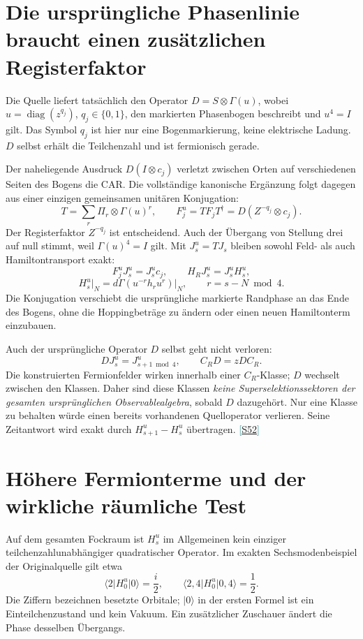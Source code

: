 \documentclass[11pt,a4paper,oneside,parskip=half,headings=normal,numbers=noenddot,bibliography=totoc]{scrreprt}
\newcommand{\ket}[1]{\lvert #1\rangle}
\newcommand{\bra}[1]{\langle #1\rvert}
\newcommand{\src}[1]{\textcolor{teal}{\small[\hyperref[s:#1]{S#1}]}}
\begin{document}
\section{Die ursprüngliche Phasenlinie braucht einen zusätzlichen Registerfaktor}
Die Quelle liefert tatsächlich den Operator $D=S\otimes\Gamma(u)$, wobei $u=\operatorname{diag}(z^{q_j})$, $q_j\in\{0,1\}$, den markierten Phasenbogen beschreibt und $u^4=I$ gilt. Das Symbol $q_j$ ist hier nur eine Bogenmarkierung, keine elektrische Ladung. $D$ selbst erhält die Teilchenzahl und ist fermionisch gerade.

Der naheliegende Ausdruck $D(I\otimes c_j)$ verletzt zwischen Orten auf verschiedenen Seiten des Bogens die CAR. Die vollständige kanonische Ergänzung folgt dagegen aus einer einzigen gemeinsamen unitären Konjugation:
\[
 T=\sum_r\Pi_r\otimes\Gamma(u)^r,
 \qquad
 \boxed{F_j^u=T F_jT^\dagger=D(Z^{-q_j}\otimes c_j).}
\]
Der Registerfaktor $Z^{-q_j}$ ist entscheidend. Auch der Übergang von Stellung drei auf null stimmt, weil $\Gamma(u)^4=I$ gilt. Mit $J_s^u=TJ_s$ bleiben sowohl Feld- als auch Hamiltontransport exakt:
\[
 F_j^uJ_s^u=J_s^u c_j,
 \qquad
 H_RJ_s^u=J_s^uH_s^u,
\]
\[
 H_s^u\big|_N=d\Gamma\!\left(u^{-r}h_ru^r\right)\big|_N,
 \qquad r=s-N\bmod4.
\]
Die Konjugation verschiebt die ursprüngliche markierte Randphase an das Ende des Bogens, ohne die Hoppingbeträge zu ändern oder einen neuen Hamiltonterm einzubauen.

Auch der ursprüngliche Operator $D$ selbst geht nicht verloren:
\[
 D J_s^u=J_{s+1\bmod4}^u,\qquad C_RD=zDC_R.
\]
Die konstruierten Fermionfelder wirken innerhalb einer $C_R$-Klasse; $D$ wechselt zwischen den Klassen. Daher sind diese Klassen \emph{keine Superselektionssektoren der gesamten ursprünglichen Observablealgebra}, sobald $D$ dazugehört. Nur eine Klasse zu behalten würde einen bereits vorhandenen Quelloperator verlieren. Seine Zeitantwort wird exakt durch $H_{s+1}^u-H_s^u$ übertragen. \src{52}

\section{Höhere Fermionterme und der wirkliche räumliche Test}
Auf dem gesamten Fockraum ist $H_s^u$ im Allgemeinen kein einziger teilchenzahlunabhängiger quadratischer Operator. Im exakten Sechsmodenbeispiel der Originalquelle gilt etwa
\[
 \bra{2}H_0^u\ket{0}=\frac i2,
 \qquad \bra{2,4}H_0^u\ket{0,4}=\frac12.
\]
Die Ziffern bezeichnen besetzte Orbitale; $\ket0$ in der ersten Formel ist ein Einteilchenzustand und kein Vakuum. Ein zusätzlicher Zuschauer ändert die Phase desselben Übergangs.
\end{document}
